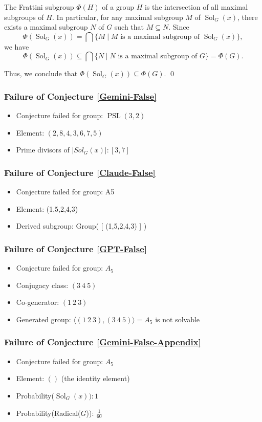 \documentclass{article}
\begin{document}
The Frattini subgroup \( \Phi(H) \) of a group \( H \) is the intersection of all maximal subgroups of \( H \). In particular, for any maximal subgroup \( M \) of \( \operatorname{Sol}_G(x) \), there exists a maximal subgroup \( N \) of \( G \) such that \( M \subseteq N \). Since
\[
\Phi(\operatorname{Sol}_G(x)) = \bigcap \{ M \mid M \text{ is a maximal subgroup of } \operatorname{Sol}_G(x) \},
\]
we have
\[
\Phi(\operatorname{Sol}_G(x)) \subseteq \bigcap \{ N \mid N \text{ is a maximal subgroup of } G \} = \Phi(G).
\]

Thus, we conclude that \( \Phi(\operatorname{Sol}_G(x)) \subseteq \Phi(G) \). \qed
\subsubsection{Failure of Conjecture \ref{Gemini-False}
}\label{Gemini-False-Explanation}
\begin{itemize}
    \item Conjecture failed for group: $\operatorname{PSL}(3,2)$
    \item Element: $(2,8,4,3,6,7,5)$
    \item Prime divisors of $|Sol_G(x)|: [ 3, 7 ]$
\end{itemize}
\subsubsection{Failure of Conjecture \ref{Claude-False}}
\begin{itemize}
    \item Conjecture failed for group: A5
\item Element: (1,5,2,4,3)
\item Derived subgroup: Group( [ (1,5,2,4,3) ] )
\end{itemize}
\subsubsection{Failure of Conjecture \ref{GPT-False}}\label{GPT-False-Explanation}
\begin{itemize}
    \item Conjecture failed for group: $A_5$
    \item Conjugacy class: \( (3\ 4\ 5) \)
    \item Co-generator: \( (1 \ 2\ 3) \)
    \item Generated group: \(\langle (1 \ 2\ 3) , (3\ 4\ 5)\rangle = A_5\) is not solvable
\end{itemize}
\subsubsection{Failure of Conjecture \ref{Gemini-False-Appendix}}\label{Gemini-False-Appendix-Explanation}
\begin{itemize}
    \item Conjecture failed for group: $A_5$
\item Element: $()$ (the identity element)
\item Probability($\operatorname{Sol}_G(x)): 1$
\item Probability(Radical($G$)): $\frac{1}{60}$
\end{itemize}
\end{document}
